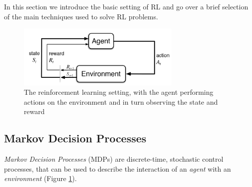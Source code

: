 In this section we introduce the basic setting of RL and go over a brief 
selection of the main techniques used to solve RL problems. 
%
\begin{figure}[h]
\includegraphics[width=0.7\textwidth]{pictures/reinforcement}
\centering
\caption[Reinforcement learning setting]{The reinforcement learning setting, 
					 with the agent performing actions on 
					 the environment and in turn observing 
					 the state and reward}
\label{f:reinforcement}
\end{figure}
%

\subsection{Markov Decision Processes}
\textit{Markov Decision Processes} (MDPs) are discrete-time, stochastic control 
processes, that can be used to describe the interaction of an \textit{agent} 
with an \textit{environment} (Figure \ref{f:reinforcement}).

